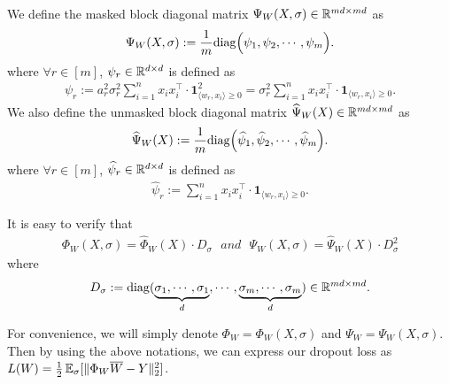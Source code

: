 \begin{definition}\label{def:Psi_first_time}
We  define the masked block diagonal matrix $\Psi_W(X, \sigma) \in\mathbb{R}^{md \times md}$ as
\begin{align*}
    \Psi_{W}(X, \sigma) :=
    \frac{1}{m}\mathrm{diag} \Big( \psi_1, \psi_2, \cdots, \psi_m \Big).
\end{align*}
where $\forall r \in [m]$, $\psi_r \in \mathbb{R}^{d \times d}$ is defined as
\begin{align*}
    \psi_r := a_r^2 \sigma_r^2\sum_{i=1}^{n} x_i x_i^{\top}\cdot \mathbf{1}_{\langle w_{r}, x_i \rangle \geq 0}^{2} = \sigma_r^2 \sum_{i=1}^{n} x_i x_i^{\top}\cdot \mathbf{1}_{\langle w_{r}, x_i \rangle \geq 0}.
\end{align*}
We also define the unmasked block diagonal matrix $\widehat{\Psi}_W(X) \in\mathbb{R}^{md \times md}$ as
\begin{align*}
    \widehat{\Psi}_{W}(X) :=
    \frac{1}{m}\mathrm{diag} \Big( \widehat{\psi}_1, \widehat{\psi}_2, \cdots, \widehat{\psi}_m \Big).
\end{align*}
where $\forall r \in [m]$, $\widehat{\psi}_r \in \mathbb{R}^{d \times d}$ is defined as
\begin{align*}
    \hat{\psi}_r := \sum_{i=1}^{n} x_i x_i^{\top}\cdot \mathbf{1}_{\langle w_{r}, x_i \rangle \geq 0}.
\end{align*}
\end{definition}

\begin{lemma}
It is easy to verify that
\begin{align*}
    \Phi_W(X,\sigma) = \hat{\Phi}_W(X) \cdot D_{\sigma} ~~~ and ~~~\Psi_W(X, \sigma) = \hat{\Psi}_W(X) \cdot D_{\sigma}^2
\end{align*}
where
\begin{align*}
    D_{\sigma} := \mathrm{diag} (\underbrace{\sigma_1,\cdots, \sigma_1}_{d}, \cdots, \underbrace{\sigma_m,\cdots, \sigma_m}_{d})\in\mathbb{R}^{md\times md}.
\end{align*}
\end{lemma}

For convenience, we will simply denote $\Phi_W = \Phi_W(X, \sigma)$ and $\Psi_W = \Psi_W(X,\sigma)$. Then by using the above notations, we can express our dropout loss as $L(W)=\frac{1}{2}\operatorname*{{\mathbb{E}}}_{\sigma} [\|\Phi_W\overline{W} - Y\|_2^2]$.


